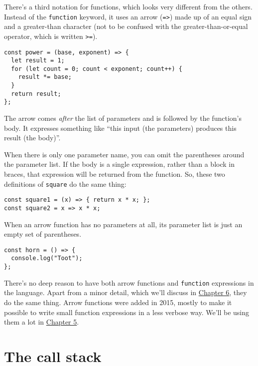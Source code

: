 There's a third notation for functions, which looks very different from the others. Instead of the \lstinline`function` keyword, it uses an arrow (\lstinline`=>`) made up of an equal sign and a greater-than character (not to be confused with the greater-than-or-equal operator, which is written \lstinline`>=`).

\begin{lstlisting}
const power = (base, exponent) => {
  let result = 1;
  for (let count = 0; count < exponent; count++) {
    result *= base;
  }
  return result;
};
\end{lstlisting}
\noindent{}

The arrow comes \emph{after} the list of parameters and is followed by the function's body. It expresses something like ``this input (the parameters) produces this result (the body)''.

When there is only one parameter name, you can omit the parentheses around the parameter list. If the body is a single expression, rather than a block in braces, that expression will be returned from the function. So, these two definitions of \lstinline`square` do the same thing:

\begin{lstlisting}
const square1 = (x) => { return x * x; };
const square2 = x => x * x;
\end{lstlisting}
\noindent{}

When an arrow function has no parameters at all, its parameter list is just an empty set of parentheses.

\begin{lstlisting}
const horn = () => {
  console.log("Toot");
};
\end{lstlisting}
\noindent{}

There's no deep reason to have both arrow functions and \lstinline`function` expressions in the language. Apart from a minor detail, which we'll discuss in \hyperref[object]{Chapter 6}, they do the same thing. Arrow functions were added in 2015, mostly to make it possible to write small function expressions in a less verbose way. We'll be using them a lot in \hyperref[higher_order]{Chapter 5}.

\label{functions.stack}\section{The call stack}

